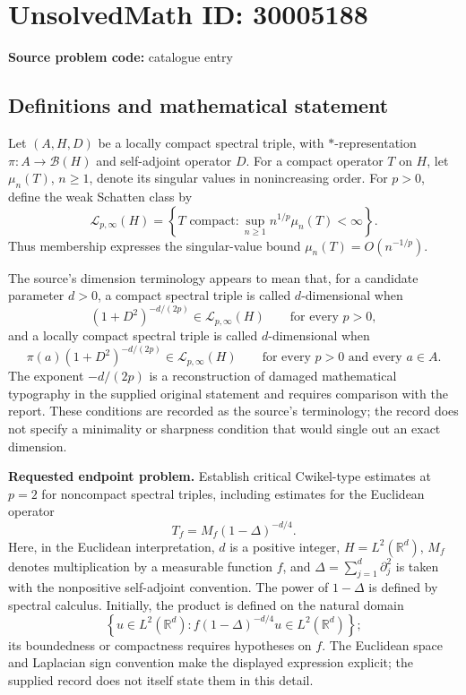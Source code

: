 \documentclass[11pt]{article}
\newcommand{\R}{\mathbb{R}}
\begin{document}
\section*{UnsolvedMath ID: 30005188}
\textbf{Source problem code:} catalogue entry
\subsection{Definitions and mathematical statement}
Let \((A,H,D)\) be a locally compact spectral triple, with \(*\)-representation \(\pi:A\to\mathcal B(H)\) and self-adjoint operator \(D\). For a compact operator \(T\) on \(H\), let \(\mu_n(T)\), \(n\geq 1\), denote its singular values in nonincreasing order. For \(p>0\), define the weak Schatten class by
\[
\mathcal L_{p,\infty}(H)=\left\{T\text{ compact}:\sup_{n\geq1}n^{1/p}\mu_n(T)<\infty\right\}.
\]
Thus membership expresses the singular-value bound \(\mu_n(T)=O(n^{-1/p})\).

The source's dimension terminology appears to mean that, for a candidate parameter \(d>0\), a compact spectral triple is called \(d\)-dimensional when
\[
(1+D^2)^{-d/(2p)}\in\mathcal L_{p,\infty}(H)
\qquad\text{for every }p>0,
\]
and a locally compact spectral triple is called \(d\)-dimensional when
\[
\pi(a)(1+D^2)^{-d/(2p)}\in\mathcal L_{p,\infty}(H)
\qquad\text{for every }p>0\text{ and every }a\in A.
\]
The exponent \(-d/(2p)\) is a reconstruction of damaged mathematical typography in the supplied original statement and requires comparison with the report. These conditions are recorded as the source's terminology; the record does not specify a minimality or sharpness condition that would single out an exact dimension.

\textbf{Requested endpoint problem.} Establish critical Cwikel-type estimates at \(p=2\) for noncompact spectral triples, including estimates for the Euclidean operator
\[
T_f=M_f(1-\Delta)^{-d/4}.
\]
Here, in the Euclidean interpretation, \(d\) is a positive integer, \(H=L^2(\R^d)\), \(M_f\) denotes multiplication by a measurable function \(f\), and \(\Delta=\sum_{j=1}^d\partial_j^2\) is taken with the nonpositive self-adjoint convention. The power of \(1-\Delta\) is defined by spectral calculus. Initially, the product is defined on the natural domain
\[
\left\{u\in L^2(\R^d):f(1-\Delta)^{-d/4}u\in L^2(\R^d)\right\};
\]
its boundedness or compactness requires hypotheses on \(f\). The Euclidean space and Laplacian sign convention make the displayed expression explicit; the supplied record does not itself state them in this detail.
\end{document}
